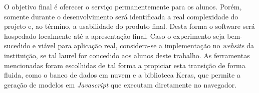 \documentclass[
	12pt,				%
	oneside,
	a4paper,			%
	english,			%
	french,				%
	spanish,			%
	brazil				%
	]{abntex2}
\begin{document}
\begin{enumerate}
\begin{enumerate}
\end{enumerate}

O objetivo final é oferecer o serviço permanentemente para os alunos. Porém, somente durante o desenvolvimento será identificada a real complexidade do projeto e, ao término, a usabilidade do produto final. Desta forma o software será hospedado localmente até a apresentação final. Caso o experimento seja bem-sucedido e viável para aplicação real, considera-se a implementação no \emph{website} da instituição, se tal laurel for concedido aos alunos deste trabalho. As ferramentas mencionadas foram escolhidas de tal forma a propiciar esta transição de forma fluida, como o banco de dados em nuvem e a biblioteca Keras, que permite a geração de modelos em \emph{Javascript} que executam diretamente no navegador.






\postextual


\end{enumerate}
\end{document}
